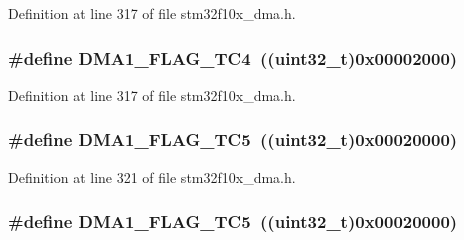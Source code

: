 Definition at line 317 of file stm32f10x\+\_\+dma.\+h.

\subsubsection[{\texorpdfstring{D\+M\+A1\+\_\+\+F\+L\+A\+G\+\_\+\+T\+C4}{DMA1_FLAG_TC4}}]{\setlength{\rightskip}{0pt plus 5cm}\#define D\+M\+A1\+\_\+\+F\+L\+A\+G\+\_\+\+T\+C4~(({\bf uint32\+\_\+t})0x00002000)}\hypertarget{group___d_m_a__flags__definition_ga78f2798eca161493d5dc6058f65b0f17}{}\label{group___d_m_a__flags__definition_ga78f2798eca161493d5dc6058f65b0f17}


Definition at line 317 of file stm32f10x\+\_\+dma.\+h.

\subsubsection[{\texorpdfstring{D\+M\+A1\+\_\+\+F\+L\+A\+G\+\_\+\+T\+C5}{DMA1_FLAG_TC5}}]{\setlength{\rightskip}{0pt plus 5cm}\#define D\+M\+A1\+\_\+\+F\+L\+A\+G\+\_\+\+T\+C5~(({\bf uint32\+\_\+t})0x00020000)}\hypertarget{group___d_m_a__flags__definition_ga438d3577b5b5b6c2c0cf1008296c23bb}{}\label{group___d_m_a__flags__definition_ga438d3577b5b5b6c2c0cf1008296c23bb}


Definition at line 321 of file stm32f10x\+\_\+dma.\+h.

\subsubsection[{\texorpdfstring{D\+M\+A1\+\_\+\+F\+L\+A\+G\+\_\+\+T\+C5}{DMA1_FLAG_TC5}}]{\setlength{\rightskip}{0pt plus 5cm}\#define D\+M\+A1\+\_\+\+F\+L\+A\+G\+\_\+\+T\+C5~(({\bf uint32\+\_\+t})0x00020000)}\hypertarget{group___d_m_a__flags__definition_ga438d3577b5b5b6c2c0cf1008296c23bb}{}\label{group___d_m_a__flags__definition_ga438d3577b5b5b6c2c0cf1008296c23bb}


